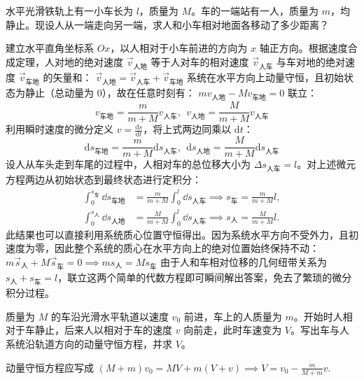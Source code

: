 \begin{example}
水平光滑铁轨上有一小车长为 $l$，质量为 $M$。车的一端站有一人，质量为 $m$，均静止。现设人从一端走向另一端，求人和小车相对地面各移动了多少距离？
\end{example}
\begin{solution}
建立水平直角坐标系 $Ox$，以人相对于小车前进的方向为 $x$ 轴正方向。根据速度合成定理，人对地的绝对速度 $\vec{v}_{\text{人地}}$ 等于人对车的相对速度 $\vec{v}_{\text{人车}}$ 与车对地的绝对速度 $\vec{v}_{\text{车地}}$ 的矢量和：
 \(\vec{v}_{\text{人地}} = \vec{v}_{\text{人车}} + \vec{v}_{\text{车地}}\) 
系统在水平方向上动量守恒，且初始状态为静止（总动量为 0），故在任意时刻有：
 \(m v_{\text{人地}} - M v_{\text{车地}} = 0\) 
联立：
\[v_{\text{车地}} = \frac{m}{m + M} v_{\text{人车}} ,~~v_{\text{人地}} = \frac{M}{m + M} v_{\text{人车}}\]
利用瞬时速度的微分定义 $v = \frac{\mathrm{d}s}{\mathrm{d}t}$，将上式两边同乘以 $\mathrm{d}t$：
\[\mathrm{d}s_{\text{车地}} = \frac{m}{m + M} \mathrm{d}s_{\text{人车}},~~\mathrm{d}s_{\text{人地}} = \frac{M}{m + M} \mathrm{d}s_{\text{人车}}\]
设人从车头走到车尾的过程中，人相对车的总位移大小为 $\Delta s_{\text{人车}} = l$。对上述微元方程两边从初始状态到最终状态进行定积分：
\[
\begin{aligned}
\int_{0}^{s_{\text{车}}} \dd s_{\text{车地}}
&= \frac{m}{m + M} \int_{0}^{l} \dd s_{\text{人车}}
\implies s_{\text{车}} = \frac{m}{m + M} l,\\
\int_{0}^{s_{\text{人}}} \dd s_{\text{人地}}
&= \frac{M}{m + M} \int_{0}^{l} \dd s_{\text{人车}}
\implies s_{\text{人}} = \frac{M}{m + M} l.
\end{aligned}
\]
此结果也可以直接利用系统质心位置守恒得出。因为系统水平方向不受外力，且初速度为零，因此整个系统的质心在水平方向上的绝对位置始终保持不动：
$m \vec{s}_{\text{人}} + M \vec{s}_{\text{车}} = 0 \implies m s_{\text{人}} = M s_{\text{车}}$
由于人和车相对位移的几何纽带关系为 $s_{\text{人}} + s_{\text{车}} = l$，联立这两个简单的代数方程即可瞬间解出答案，免去了繁琐的微分积分过程。
\end{solution}

\begin{exercise}
质量为 \(M\) 的车沿光滑水平轨道以速度 \(v_0\) 前进，车上的人质量为 \(m\)。开始时人相对于车静止，后来人以相对于车的速度 \(v\) 向前走，此时车速变为 \(V\)。写出车与人系统沿轨道方向的动量守恒方程，并求 \(V\)。
\end{exercise}
\begin{solution}
动量守恒方程应写成
 \((M+m)v_0=MV+m(V+v)\implies \boxed{V=v_0-\frac{m}{M+m}v}.\) 
\end{solution}

